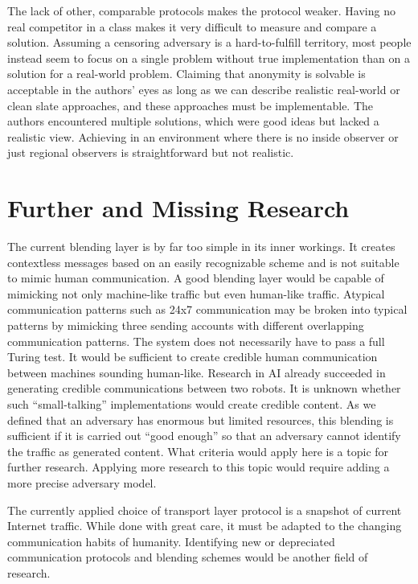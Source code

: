 The lack of other, comparable protocols makes the \MessageVortex{} protocol weaker. Having no real competitor in a class makes it very difficult to measure and compare a solution. Assuming a censoring adversary is a hard-to-fulfill territory, most people instead seem to focus on a single problem without true implementation than on a solution for a real-world problem. Claiming that anonymity is solvable is acceptable in the authors' eyes as long as we can describe realistic real-world or clean slate approaches, and these approaches must be implementable. The authors encountered multiple solutions, which were good ideas but lacked a realistic view. Achieving in an environment where there is no inside observer or just regional observers is straightforward but not realistic. 

\section{Further and Missing Research}
The current blending layer is by far too simple in its inner workings. It creates contextless messages based on an easily recognizable scheme and is not suitable to mimic human communication. A good blending layer would be capable of mimicking not only machine-like traffic but even human-like traffic. Atypical communication patterns such as 24x7 communication may be broken into typical patterns by mimicking three sending accounts with different overlapping communication patterns. The system does not necessarily have to pass a full Turing test. It would be sufficient to create credible human communication between machines sounding human-like. Research in AI already succeeded in generating credible communications between two robots. It is unknown whether such ``small-talking'' implementations would create credible content. As we defined that an adversary has enormous but limited resources, this blending is sufficient if it is carried out ``good enough'' so that an adversary cannot identify the traffic as generated content. What criteria would apply here is a topic for further research. Applying more research to this topic would require adding a more precise adversary model.

The currently applied choice of transport layer protocol is a snapshot of current Internet traffic. While done with great care, it must be adapted to the changing communication habits of humanity. Identifying new or depreciated communication protocols and blending schemes would be another field of research.

